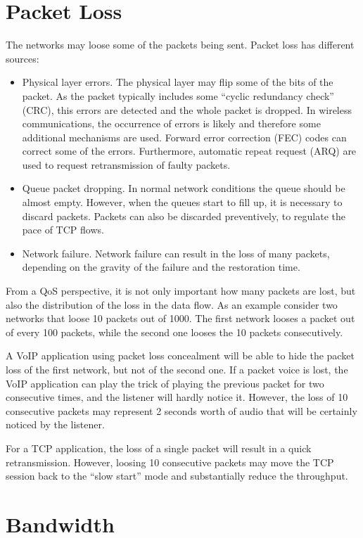 \section{Packet Loss}

The networks may loose some of the packets being sent.
Packet loss has different sources:
\begin{itemize}
\item Physical layer errors. 
The physical layer may flip some of the bits of the packet.
As the packet typically includes some ``cyclic redundancy check'' (CRC), this errors are detected and the whole packet is dropped.
In wireless communications, the occurrence of errors is likely and therefore some additional mechanisms are used.
Forward error correction (FEC) codes can correct some of the errors.
Furthermore, automatic repeat request (ARQ) are used to request retransmission of faulty packets.
\item Queue packet dropping.
In normal network conditions the queue should be almost empty.
However, when the queues start to fill up, it is necessary to discard packets.
Packets can also be discarded preventively, to regulate the pace of TCP flows.
\item Network failure.
Network failure can result in the loss of many packets, depending on the gravity of the failure and the restoration time.
\end{itemize}

From a QoS perspective, it is not only important how many packets are lost, but also the distribution of the loss in the data flow.
As an example consider two networks that loose 10 packets out of 1000. 
The first network looses a packet out of every 100 packets, while the second one looses the 10 packets consecutively. 

A VoIP application using packet loss concealment will be able to hide the packet loss of the first network, but not of the second one.
If a packet voice is lost, the VoIP application can play the trick of playing the previous packet for two consecutive times, and the listener will hardly notice it.
However, the loss of 10 consecutive packets may represent 2 seconds worth of audio that will be certainly noticed by the listener.

For a TCP application, the loss of a single packet will result in a quick retransmission.
However, loosing 10 consecutive packets may move the TCP session back to the ``slow start'' mode and substantially reduce the throughput.

\section{Bandwidth}

